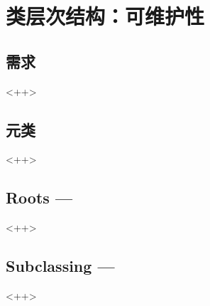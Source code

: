 

\chapter{类层次结构：可维护性}
\label{ch:ClassHierarchy}

\section{需求}<++>

\section{元类}<++>

\section{Roots ---}<++>

\section{Subclassing ---}<++>

